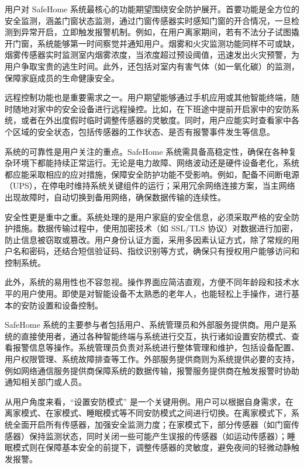 

用户对 SafeHome 系统最核心的功能期望围绕安全防护展开。首要功能是全方位的安全监测，涵盖门窗状态监测，通过门窗传感器实时感知门窗的开合情况，一旦检测到异常开启，立即触发报警机制。例如，在用户离家期间，若有不法分子试图撬开门窗，系统能够第一时间察觉并通知用户。烟雾和火灾监测功能同样不可或缺，烟雾传感器实时监测室内烟雾浓度，当浓度超过预设阈值，迅速发出火灾预警，为用户争取宝贵的逃生时间。此外，还包括对室内有害气体（如一氧化碳）的监测，保障家庭成员的生命健康安全。

远程控制功能也是重要需求之一。用户期望能够通过手机应用或其他智能终端，随时随地对家中的安全设备进行远程操控。比如，在下班途中提前开启家中的安防系统，或者在外出度假时临时调整传感器的灵敏度。同时，用户应能实时查看家中各个区域的安全状态，包括传感器的工作状态、是否有报警事件发生等信息。


系统的可靠性是用户关注的重点。SafeHome 系统需具备高稳定性，确保在各种复杂环境下都能持续正常运行。无论是电力故障、网络波动还是硬件设备老化，系统都应能采取相应的应对措施，保障安全防护功能不受影响。例如，配备不间断电源（UPS），在停电时维持系统关键组件的运行；采用冗余网络连接方案，当主网络出现故障时，自动切换到备用网络，确保数据传输的连续性。

安全性更是重中之重。系统处理的是用户家庭的安全信息，必须采取严格的安全防护措施。数据传输过程中，使用加密技术（如 SSL/TLS 协议）对数据进行加密，防止信息被窃取或篡改。用户身份认证方面，采用多因素认证方式，除了常规的用户名和密码，还结合短信验证码、指纹识别等方式，确保只有授权用户能够访问和控制系统。

此外，系统的易用性也不容忽视。操作界面应简洁直观，方便不同年龄段和技术水平的用户使用。即使是对智能设备不太熟悉的老年人，也能轻松上手操作，进行基本的安防设置和设备控制。



SafeHome 系统的主要参与者包括用户、系统管理员和外部服务提供商。用户是系统的直接使用者，通过各种智能终端与系统进行交互，执行诸如设置安防模式、查看报警信息等操作。系统管理员负责对系统进行整体管理和维护，包括设备配置、用户权限管理、系统故障排查等工作。外部服务提供商则为系统提供必要的支持，例如网络通信服务提供商保障系统的数据传输，报警服务提供商在触发报警时协助通知相关部门或人员。


从用户角度来看，``设置安防模式'' 是一个关键用例。用户可以根据自身需求，在离家模式、在家模式、睡眠模式等不同安防模式之间进行切换。在离家模式下，系统全面开启所有传感器，加强安全监测力度；在家模式下，部分传感器（如门窗传感器）保持监测状态，同时关闭一些可能产生误报的传感器（如运动传感器）；睡眠模式则在保障基本安全的前提下，调整传感器的灵敏度，避免夜间的轻微动静触发报警。

